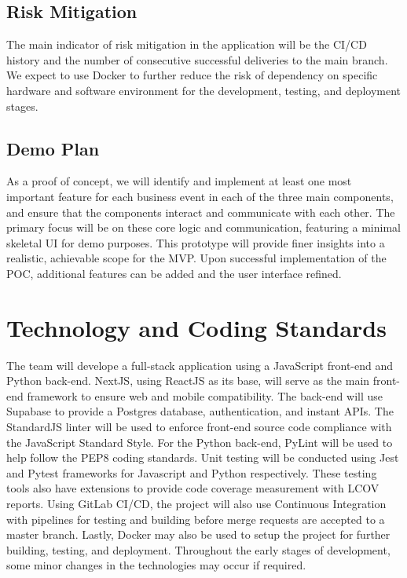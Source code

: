 \documentclass{article}
\begin{document}
\subsection{Risk Mitigation}

The main indicator of risk mitigation in the application will be the CI/CD
history and the number of consecutive successful deliveries to the main branch.
We expect to use Docker to further reduce the risk of dependency on specific
hardware and software environment for the development, testing, and deployment
stages.

\subsection{Demo Plan}

As a proof of concept, we will identify and implement at least one most
important feature for each business event in each of the three main components,
and ensure that the components interact and communicate with each other. The
primary focus will be on these core logic and communication, featuring a
minimal skeletal UI for demo purposes. This prototype will provide finer
insights into a realistic, achievable scope for the MVP. Upon successful
implementation of the POC, additional features can be added and the user
interface refined.


\section{Technology and Coding Standards}

The team will develope a full-stack application using a JavaScript front-end
and Python back-end. NextJS, using ReactJS as its base, will serve as the main
front-end framework to ensure web and mobile compatibility. The back-end will
use Supabase to provide a Postgres database, authentication, and instant APIs.
The StandardJS linter will be used to enforce front-end source code compliance
with the JavaScript Standard Style. For the Python back-end, PyLint will be
used to help follow the PEP8 coding standards. Unit testing will be conducted
using Jest and Pytest frameworks for Javascript and Python respectively. These
testing tools also have extensions to provide code coverage measurement with
LCOV reports. Using GitLab CI/CD, the project will also use Continuous
Integration with pipelines for testing and building before merge requests are
accepted to a master branch. Lastly, Docker may also be used to setup the
project for further building, testing, and deployment. Throughout the early
stages of development, some minor changes in the technologies may occur if
required.
\end{document}
